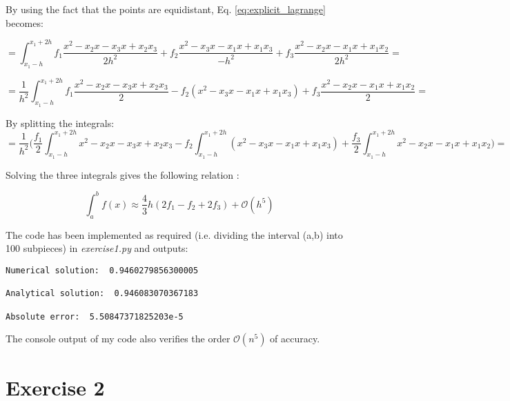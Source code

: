 \documentclass[12pt]{article}
\begin{document}
By using the fact that the points are equidistant, Eq. \ref{eq:explicit_lagrange} becomes: 

\begin{equation}
	= \int_{x_1 - h}^{x_1+2h} 
	f_1 \frac{x^2 - x_2 x - x_3 x + x_2 x_3}{2h^2} +
	  f_2 \frac{x^2 - x_3 x - x_1 x + x_1 x_3}{-h^2} +
	f_3 \frac{x^2 - x_2 x - x_1 x + x_1 x_2}{2h^2} =
\end{equation}

\begin{equation}
	= \frac{1}{h^2} \int_{x_1 - h}^{x_1+2h} 
	f_1 \frac{x^2 - x_2 x - x_3 x + x_2 x_3}{2} -
	   f_2 (x^2 - x_3 x - x_1 x + x_1 x_3) +
	f_3 \frac{x^2 - x_2 x - x_1 x + x_1 x_2}{2} =
\end{equation}

By splitting the integrals: \\

\begin{equation}
	= \frac{1}{h^2} \bigg( 
	\frac{f_1}{2} \int_{x_1 - h}^{x_1+2h} x^2 - x_2 x - x_3 x + x_2 x_3 -
	   f_2 \int_{x_1 - h}^{x_1+2h} (x^2 - x_3 x - x_1 x + x_1 x_3) +
	\frac{f_3}{2} \int_{x_1 - h}^{x_1+2h} x^2 - x_2 x - x_1 x + x_1 x_2 \bigg) =
	\label{eq:last_step}
\end{equation}

Solving the three integrals gives the following relation :

\begin{equation}
	\int_a^b f(x) \approx \frac{4}{3} h (2 f_1 - f_2 + 2 f_3) +  \mathcal{O}(h^5)
\end{equation} 

The code has been implemented as required (i.e. dividing the interval (a,b) into 100 subpieces) in \textit{exercise1.py} and outputs: \\

\begin{center}
\begin{lstlisting}
Numerical solution:  0.9460279856300005

Analytical solution:  0.946083070367183

Absolute error:  5.50847371825203e-5	
\end{lstlisting}	
\end{center}

The console output of my code also verifies the order $\mathcal{O}(n^5)$ of accuracy. 


\section*{Exercise 2}
\end{document}

